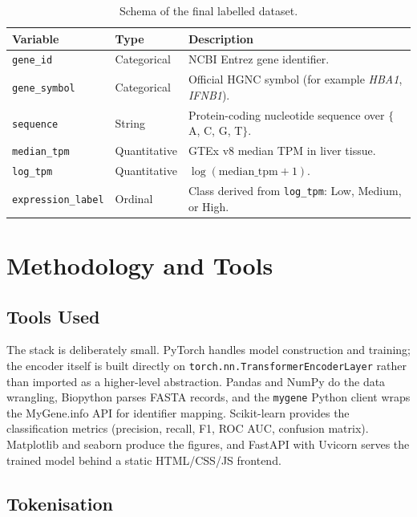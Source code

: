\documentclass[11pt,a4paper]{article}
\begin{document}
\begin{table}[H]
\centering
\begin{tabular}{@{}lll@{}}
\toprule
\textbf{Variable} & \textbf{Type} & \textbf{Description} \\
\midrule
\texttt{gene\_id} & Categorical & NCBI Entrez gene identifier. \\
\texttt{gene\_symbol} & Categorical & Official HGNC symbol (for example \emph{HBA1}, \emph{IFNB1}). \\
\texttt{sequence} & String & Protein-coding nucleotide sequence over $\{$A, C, G, T$\}$. \\
\texttt{median\_tpm} & Quantitative & GTEx v8 median TPM in liver tissue. \\
\texttt{log\_tpm} & Quantitative & $\log(\text{median\_tpm} + 1)$. \\
\texttt{expression\_label} & Ordinal & Class derived from \texttt{log\_tpm}: Low, Medium, or High. \\
\bottomrule
\end{tabular}
\caption{Schema of the final labelled dataset.}
\label{tab:schema}
\end{table}

\section{Methodology and Tools}

\subsection{Tools Used}

The stack is deliberately small. PyTorch handles model construction and training; the encoder itself is built directly on \texttt{torch.nn.TransformerEncoderLayer} rather than imported as a higher-level abstraction. Pandas and NumPy do the data wrangling, Biopython parses FASTA records, and the \texttt{mygene} Python client wraps the MyGene.info API for identifier mapping. Scikit-learn provides the classification metrics (precision, recall, F1, ROC AUC, confusion matrix). Matplotlib and seaborn produce the figures, and FastAPI with Uvicorn serves the trained model behind a static HTML/CSS/JS frontend.

\subsection{Tokenisation}
\end{document}
